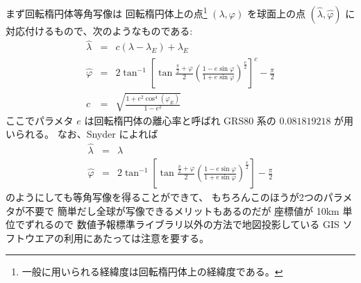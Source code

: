 まず回転楕円体等角写像は
回転楕円体上の点\footnote{
	一般に用いられる経緯度は回転楕円体上の経緯度である。
}
\((\lambda, \varphi)\)
を球面上の点
\((\hat{\lambda}, \hat{\varphi})\)
に対応付けるもので、次のようなものである:
\begin{eqnarray}
 \hat{\lambda} &=& c(\lambda - \lambda_E) + \lambda_E
 \label{eq:gauss-aposphere:lon}
\\
 \hat{\varphi} &=&
	2\tan^{-1} \left[
		\tan \frac{\frac{\pi}{2} + \varphi}{2}
		\left(
			\frac{1 - e\sin\varphi}{1 + e\sin\varphi}
		\right)^{\frac{e}{2}}
	\right]^{c}
	- \frac{\pi}{2}
 \label{eq:gauss-aposphere:lat}
\\
 c &=& \sqrt{
   \frac{1 + e^2\cos^4(\varphi_E)}{1 - e^2}
 \label{eq:gauss-aposphere:last}
 }
\end{eqnarray}
ここでパラメタ $e$ は回転楕円体の離心率と呼ばれ
GRS80 系の $0.081819218$ が用いられる。
なお、Snyder \cite{snyder} によれば
\begin{eqnarray}
	\hat{\lambda} &=& \lambda
	\label{eq:snyder-aposphere:lon}
\\
	\hat{\varphi} &=&
	2\tan^{-1} \left[
		\tan \frac{\frac{\pi}{2} + \varphi}{2}
		\left(
			\frac{1 - e\sin\varphi}{1 + e\sin\varphi}
		\right)^{\frac{e}{2}}
	\right]
	- \frac{\pi}{2}
	\label{eq:snyder-aposphere:lat}
\end{eqnarray}
のようにしても等角写像を得ることができて、
もちろんこのほうが2つのパラメタが不要で
簡単だし全球が写像できるメリットもあるのだが
座標値が 10km 単位でずれるので
数値予報標準ライブラリ以外の方法で地図投影している
GIS ソフトウエアの利用にあたっては注意を要する。

